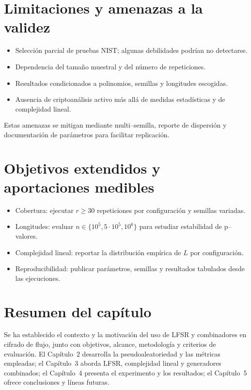 \section*{Limitaciones y amenazas a la validez}

\begin{itemize}
  \item Selección parcial de pruebas NIST; algunas debilidades podrían no detectarse.
  \item Dependencia del tamaño muestral y del número de repeticiones.
  \item Resultados condicionados a polinomios, semillas y longitudes escogidas.
  \item Ausencia de criptoanálisis activo más allá de medidas estadísticas y de complejidad lineal.
\end{itemize}
Estas amenazas se mitigan mediante multi–semilla, reporte de dispersión y documentación de parámetros para facilitar replicación.

\section*{Objetivos extendidos y aportaciones medibles}

\begin{itemize}
  \item Cobertura: ejecutar $r\geq 30$ repeticiones por configuración y semillas variadas.
  \item Longitudes: evaluar $n\in\{10^5,5\cdot 10^5,10^6\}$ para estudiar estabilidad de p--valores.
  \item Complejidad lineal: reportar la distribución empírica de $L$ por configuración.
  \item Reproducibilidad: publicar parámetros, semillas y resultados tabulados desde las ejecuciones.
\end{itemize}

\section*{Resumen del capítulo}

Se ha establecido el contexto y la motivación del uso de LFSR y combinadores en cifrado de flujo, junto con objetivos, alcance, metodología y criterios de evaluación. El Capítulo~2 desarrolla la pseudoaleatoriedad y las métricas empleadas; el Capítulo~3 aborda LFSR, complejidad lineal y generadores combinados; el Capítulo~4 presenta el experimento y los resultados; el Capítulo~5 ofrece conclusiones y líneas futuras.
